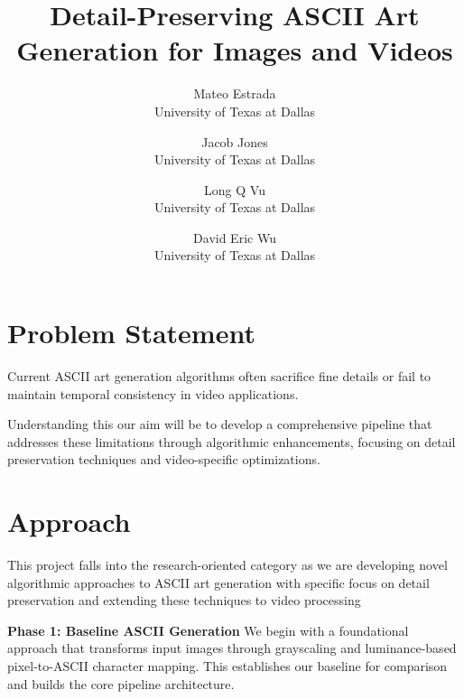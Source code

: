 \documentclass[10pt,twocolumn,letterpaper]{article}
\begin{document}
\title{Detail-Preserving ASCII Art Generation for Images and Videos}

\author{Mateo Estrada\\
University of Texas at Dallas\\
\and
Jacob Jones\\
University of Texas at Dallas\\
\and
Long Q Vu\\
University of Texas at Dallas\\
\and
David Eric Wu\\
University of Texas at Dallas\\
}
\maketitle

\section{Problem Statement}
\label{sec:intro}

Current ASCII art generation algorithms often sacrifice fine details or fail to maintain temporal consistency in video applications.

Understanding this our aim will be to develop a comprehensive pipeline that addresses these limitations through algorithmic enhancements, focusing on detail preservation techniques and video-specific optimizations.


\section{Approach}

This project falls into the research-oriented category as we are developing novel algorithmic approaches to ASCII art generation with specific focus on detail preservation and extending these techniques to video processing

\textbf{Phase 1: Baseline ASCII Generation}
We begin with a foundational approach that transforms input images through grayscaling and luminance-based pixel-to-ASCII character mapping. This establishes our baseline for comparison and builds the core pipeline architecture.
\end{document}
